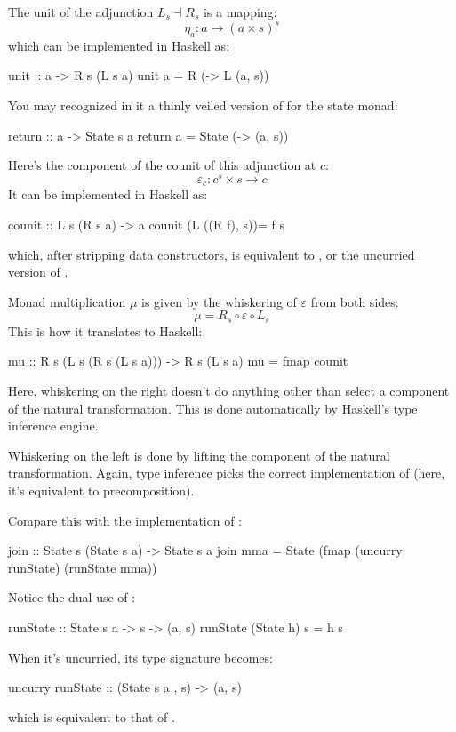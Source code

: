 \documentclass[DaoFP]{subfiles}
\begin{document}
The unit of the adjunction $L_s \dashv R_s$ is a mapping:
\[ \eta_a \colon a \to (a \times s)^s \]
which can be implemented in Haskell as:
\begin{haskell}
unit :: a -> R s (L s a)
unit a = R (\s -> L (a, s))
\end{haskell}
You may recognized in it a thinly veiled version of  for the state monad:
\begin{haskell}
return :: a -> State s a
return a = State (\s -> (a, s))
\end{haskell}

Here's the component of the counit of this adjunction at $c$:
\[ \varepsilon_c \colon c^s \times s \to c \]
It can be implemented in Haskell as:
\begin{haskell}
counit :: L s (R s a) -> a
counit (L ((R f), s))= f s
\end{haskell}
which, after stripping data constructors, is equivalent to , or the uncurried version of .

Monad multiplication $\mu$ is given by the whiskering of $\varepsilon$ from both sides:
\[ \mu = R_s \circ \varepsilon \circ L_s \]
This is how it translates to Haskell:
\begin{haskell}
mu :: R s (L s (R s (L s a))) -> R s (L s a)
mu = fmap counit
\end{haskell}
Here, whiskering on the right doesn't do anything other than select a component of the natural transformation. This is done automatically by Haskell's type inference engine. 

Whiskering on the left is done by lifting the component of the natural transformation. Again, type inference picks the correct implementation of  (here, it's equivalent to precomposition).

Compare this with the implementation of :
\begin{haskell}
join :: State s (State s a) -> State s a
join mma = State (fmap (uncurry runState) (runState mma))
\end{haskell}
Notice the dual use of : 
\begin{haskell}
runState :: State s a -> s -> (a, s)
runState (State h) s = h s
\end{haskell}
When it's uncurried, its type signature becomes:
\begin{haskell}
uncurry runState :: (State s a , s) -> (a, s)
\end{haskell}
which is equivalent to that of . 
\end{document}
